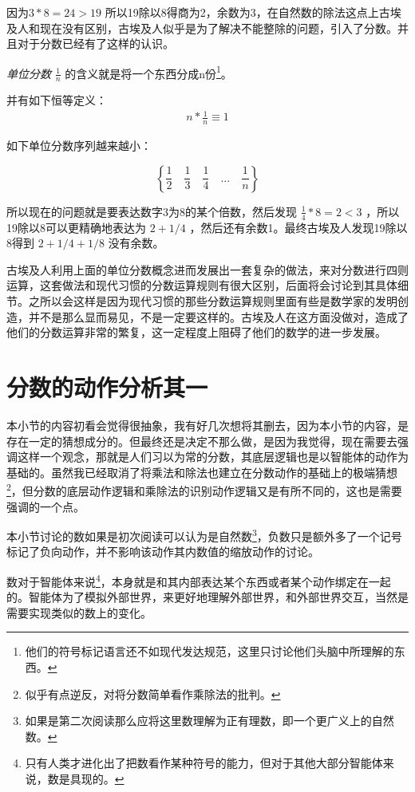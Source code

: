 \documentclass[12pt,oneside]{book}
\begin{document}
因为$3*8=24>19$ 所以19除以8得商为2，余数为3，在自然数的除法这点上古埃及人和现在没有区别，古埃及人似乎是为了解决不能整除的问题，引入了分数。并且对于分数已经有了这样的认识。

\emph{单位分数} $\frac{1}{n}$ 的含义就是将一个东西分成n份\footnote{他们的符号标记语言还不如现代发达规范，这里只讨论他们头脑中所理解的东西。}。

并有如下恒等定义：
\begin{align}
n * \frac{1}{n} \equiv 1
\end{align}

如下单位分数序列越来越小：

\[
\left\{\frac{1}{2} \quad \frac{1}{3}  \quad \frac{1}{4} \quad  ...  \quad \frac{1}{n} \right\}
\]

所以现在的问题就是要表达数字3为8的某个倍数，然后发现 $\frac{1}{4} * 8 = 2<3$ ，所以19除以8可以更精确地表达为 $2 + 1/4$ ，然后还有余数1。最终古埃及人发现19除以8得到 $2 + 1/4 + 1/8$ 没有余数。

古埃及人利用上面的单位分数概念进而发展出一套复杂的做法，来对分数进行四则运算，这套做法和现代习惯的分数运算规则有很大区别，后面将会讨论到其具体细节。之所以会这样是因为现代习惯的那些分数运算规则里面有些是数学家的发明创造，并不是那么显而易见，不是一定要这样的。古埃及人在这方面没做对，造成了他们的分数运算非常的繁复，这一定程度上阻碍了他们的数学的进一步发展。
 

\section{分数的动作分析其一}
本小节的内容初看会觉得很抽象，我有好几次想将其删去，因为本小节的内容，是存在一定的猜想成分的。但最终还是决定不那么做，是因为我觉得，现在需要去强调这样一个观念，那就是人们习以为常的分数，其底层逻辑也是以智能体的动作为基础的。虽然我已经取消了将乘法和除法也建立在分数动作的基础上的极端猜想\footnote{似乎有点逆反，对将分数简单看作乘除法的批判。}，但分数的底层动作逻辑和乘除法的识别动作逻辑又是有所不同的，这也是需要强调的一个点。

本小节讨论的数如果是初次阅读可以认为是自然数\footnote{如果是第二次阅读那么应将这里数理解为正有理数，即一个更广义上的自然数。}，负数只是额外多了一个记号标记了负向动作，并不影响该动作其内数值的缩放动作的讨论。

数对于智能体来说\footnote{只有人类才进化出了把数看作某种符号的能力，但对于其他大部分智能体来说，数是具现的。}，本身就是和其内部表达某个东西或者某个动作绑定在一起的。智能体为了模拟外部世界，来更好地理解外部世界，和外部世界交互，当然是需要实现类似的数上的变化。
\end{document}
